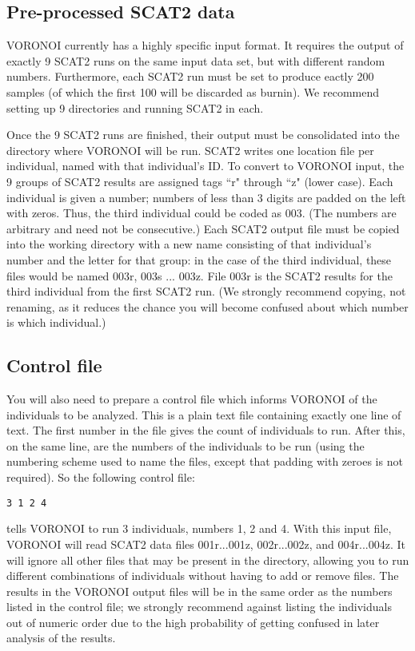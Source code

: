 \documentclass[10pt,titlepage,times,letterpaper]{article}
\begin{document}
\subsection{Pre-processed SCAT2 data}

VORONOI currently has a highly specific input format.  It requires the output of exactly
9 SCAT2 runs on the same input data set, but with different random numbers.  Furthermore,
each SCAT2 run must be set to produce eactly 200 samples (of which the first 100 will be
discarded as burnin).  We recommend setting up 9 directories and running SCAT2 in each.

Once the 9 SCAT2 runs are finished, their output must be consolidated into the directory
where VORONOI will be run.
SCAT2 writes one location file per individual, named with that individual's ID. 
To convert to VORONOI input, the 9 groups of SCAT2
results are assigned tags ``r" through ``z" (lower case).  Each individual is 
given a number; numbers of less than 3 digits are padded on the left with zeros.  Thus, the
third individual could be coded as 003.  (The numbers are arbitrary and need not 
be consecutive.)  Each SCAT2 output file must be copied into the working
directory with a new name consisting of that individual's number
and the letter for that group:  in the case of the third individual, these files would
be named 003r, 003s ... 003z.  File 003r is the SCAT2 results for the third individual from
the first SCAT2 run.  (We strongly recommend copying, not renaming, as it reduces
the chance you will become confused about which number is which individual.)

\subsection{Control file}

You will also need to prepare a control file which informs VORONOI of the
individuals to be analyzed.  This is a plain text file containing exactly one line of
text.  The first number in the file gives the count of individuals to run.
After this, on the same line, are the numbers of the individuals to be run (using the
numbering scheme used to name the files, except that padding with zeroes is not
required).  So the following control file:

{\tt 3 1 2 4}

tells VORONOI to run 3 individuals, numbers 1, 2 and 4.  
With this input file, VORONOI will read SCAT2 data files 001r...001z, 002r...002z, and 004r...004z.
It will ignore all other files that may be present in the directory, allowing you to run different 
combinations of individuals without having to add or remove files.  The results in the VORONOI
output files will be in the same order as the numbers listed in the control file; we strongly
recommend against listing the individuals out of numeric order due to the high probability
of getting confused in later analysis of the results.
\end{document}
